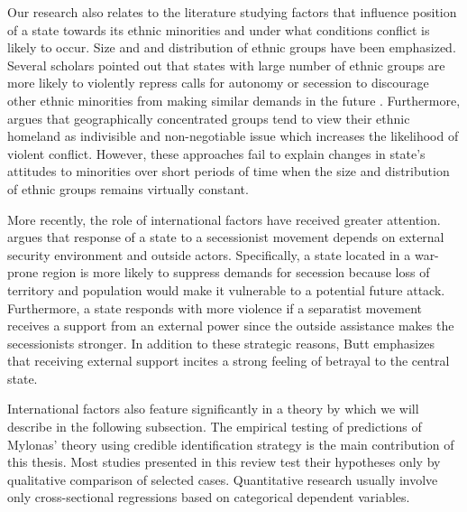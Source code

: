 Our research also relates to the literature studying factors that influence position of a state towards its ethnic minorities and under what conditions conflict is likely to occur. Size and and distribution of ethnic groups have been emphasized. Several scholars pointed out that
states with large number of ethnic groups are more likely to violently repress calls for autonomy or secession to discourage other ethnic minorities from making similar demands in the future \citep{evera_hypotheses_1994, toft_geography_2005,walter_reputation_2009}. 
Furthermore,  \citet{toft_geography_2005} argues that geographically concentrated groups tend to view their ethnic homeland as indivisible and non-negotiable issue which increases the likelihood of violent conflict. However, these approaches fail to explain changes in state's attitudes to minorities over short periods of time when the size and distribution of ethnic groups remains virtually constant. 

More recently, the role of international factors have received greater attention.  \citet{butt_secession_2017}  argues that response of a state to a secessionist movement depends on external security environment and outside actors. Specifically, a state located in a war-prone region is more likely to suppress demands for secession because loss of territory and population would make it vulnerable  to a potential future attack. Furthermore, a state responds with more violence if a separatist movement receives a support from an external power since the outside assistance makes the secessionists stronger. In addition to these strategic reasons, Butt emphasizes that  receiving external support incites  a strong feeling of betrayal to the central state.   

International factors also feature significantly in a theory by  \citet{mylonas_politics_2013} which we will describe in the following subsection. 
The empirical testing of predictions  of  Mylonas' theory using credible identification strategy is the main contribution of this thesis.
Most studies presented in this review test their hypotheses only by qualitative comparison of selected cases. Quantitative research usually involve only cross-sectional regressions based on categorical dependent variables.    

